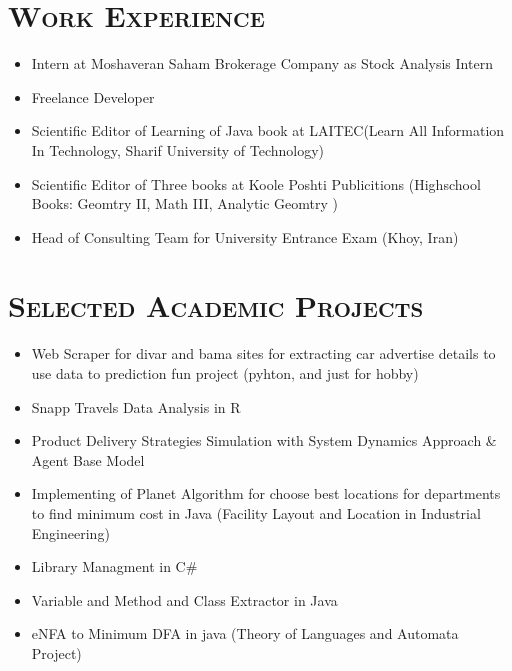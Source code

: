 \documentclass[line,margin]{res}
\begin{document}
\begin{resume}
\begin{spacing}{1.1}

\section{\textsc{Work Experience}}
\begin{itemize}
\item Intern at Moshaveran Saham Brokerage Company as Stock Analysis Intern
\item Freelance Developer
\item Scientific Editor of Learning of Java book at LAITEC(Learn All Information In Technology, Sharif University of Technology)
\item Scientific Editor of Three books at Koole Poshti Publicitions (Highschool Books: Geomtry II, Math III, Analytic Geomtry )
\item Head of Consulting Team for University Entrance Exam (Khoy, Iran)

\end{itemize}

\section{\textsc{Selected Academic Projects}}
\begin{itemize}
\item Web Scraper for divar and bama sites for extracting car advertise details  to use data to prediction fun project (pyhton, and just for hobby)
\item Snapp Travels Data Analysis in R
\item Product Delivery Strategies Simulation with System Dynamics Approach \& Agent Base Model
\item  Implementing of Planet Algorithm for choose best locations for departments to find minimum cost in Java (Facility Layout and Location in Industrial Engineering)

\item Library Managment in C\#
\item Variable and Method and Class Extractor in Java
\item eNFA to Minimum DFA in java (Theory of Languages and Automata Project)
\end{itemize}






\end{spacing}
\end{resume}
\end{document}
